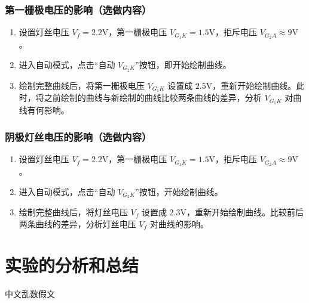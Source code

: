 \documentclass{../template/myrpt}
\begin{document}
\subsubsection{第一栅极电压的影响（选做内容）}

\begin{enumerate}[label=(\arabic*)]
  \item 设置灯丝电压 $V_f = 2.2\text{V}$，第一栅极电压 $V_{G_1K} = 1.5\text{V}$，拒斥电压 $V_{G_2A} \approx 9\text{V}$。
  \item 进入自动模式，点击“自动 $V_{G_2K}$”按钮，即开始绘制曲线。
  \item 绘制完整曲线后，将第一栅极电压 $V_{G_1K}$ 设置成 $2.5\text{V}$，重新开始绘制曲线。此时，将之前绘制的曲线与新绘制的曲线比较两条曲线的差异，分析 $V_{G_1K}$ 对曲线有何影响。
\end{enumerate}

\subsubsection{阴极灯丝电压的影响（选做内容）}

\begin{enumerate}[label=(\arabic*)]
  \item 设置灯丝电压 $V_f = 2.2\text{V}$，第一栅极电压 $V_{G_1K} = 1.5\text{V}$，拒斥电压 $V_{G_2A} \approx 9\text{V}$。
  \item 进入自动模式，点击“自动 $V_{G_2K}$”按钮，开始绘制曲线。
  \item 绘制完整曲线后，将灯丝电压 $V_f$ 设置成 $2.3\text{V}$，重新开始绘制曲线。比较前后两条曲线的差异，分析灯丝电压 $V_f$ 对曲线的影响。
\end{enumerate}

\section{实验的分析和总结}

中文乱数假文
\zhlipsum[1-2]

\insertRawDataPage
\end{document}
